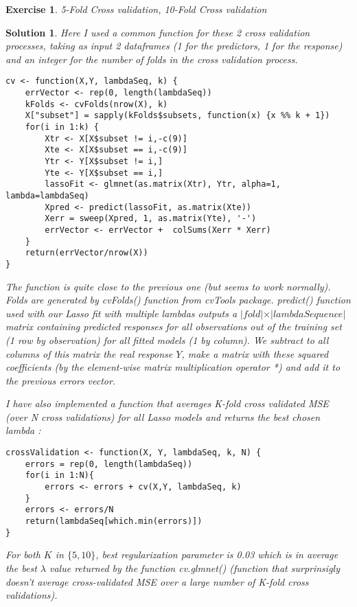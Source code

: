 \documentclass[12pt,a4paper]{article}
\newtheorem{exercise}{Exercise}
\newtheorem{solution}{Solution}
\begin{document}
\begin{exercise}
5-Fold Cross validation, 10-Fold Cross validation
\end{exercise}

\begin{solution}
Here I used a common function for these 2 cross validation processes, taking as input 2 dataframes (1 for the predictors, 1 for the response) and an integer for the number of folds in the cross validation process.

\begin{verbatim}
cv <- function(X,Y, lambdaSeq, k) {
    errVector <- rep(0, length(lambdaSeq))
    kFolds <- cvFolds(nrow(X), k)
    X["subset"] = sapply(kFolds$subsets, function(x) {x %% k + 1})
    for(i in 1:k) {
        Xtr <- X[X$subset != i,-c(9)]
        Xte <- X[X$subset == i,-c(9)]
        Ytr <- Y[X$subset != i,]
        Yte <- Y[X$subset == i,]
        lassoFit <- glmnet(as.matrix(Xtr), Ytr, alpha=1, lambda=lambdaSeq)
        Xpred <- predict(lassoFit, as.matrix(Xte))
        Xerr = sweep(Xpred, 1, as.matrix(Yte), '-')
        errVector <- errVector +  colSums(Xerr * Xerr)
    }
    return(errVector/nrow(X))
}
\end{verbatim}

The function is quite close to the previous one (but seems to work normally). Folds are generated by cvFolds() function from cvTools package. predict() function used with our Lasso fit with multiple lambdas outputs a $\vert fold \vert \times \vert lambdaSequence \vert$ matrix containing predicted responses for all observations out of the training set (1 row by observation) for all fitted models (1 by column). We subtract to all columns of this matrix the real response $Y$, make a matrix with these squared coefficients (by the element-wise matrix multiplication operator *) and add it to the previous errors vector.

I have also implemented a function that averages K-fold cross validated MSE (over N cross validations) for all Lasso models and returns the best chosen lambda : 

\begin{verbatim}
crossValidation <- function(X, Y, lambdaSeq, k, N) {
    errors = rep(0, length(lambdaSeq))
    for(i in 1:N){
        errors <- errors + cv(X,Y, lambdaSeq, k)
    }
    errors <- errors/N
    return(lambdaSeq[which.min(errors)])
}
\end{verbatim}

For both $K$ in $\{5,10\}$, best regularization parameter is 0.03 which is in average the best $\lambda$ value returned by the function cv.glmnet() (function that surprinsigly doesn't average cross-validated MSE over a large number of K-fold cross validations).\\


\end{solution}
\end{document}
